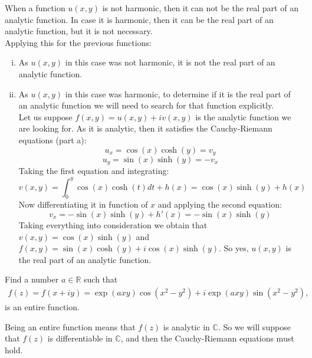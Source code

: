 \documentclass{report}
\def\R{\mathbb{R}}
\def\C{\mathbb{C}}
\renewcommand{\exp}[1]{\operatorname{exp} \left(#1\right)}
\begin{document}
    When a function $u(x,y)$ is not harmonic, then it can not be the real part of an analytic function. In case it is harmonic, then it can be the real part of an analytic function, but it is not necessary.\\
    Applying this for the previous functions:
    \begin{enumerate}[(i)]
        \item As $u(x,y)$ in this case was not harmonic, it is not the real part of an analytic function.
        \item As $u(x,y)$ in this case was harmonic, to determine if it is the real part of an analytic function we will need to search for that function explicitly. 
        \\Let us suppose $f(x,y)=u(x,y)+iv(x,y)$ is the analytic function we are looking for. As it is analytic, then it satisfies the Cauchy-Riemann equations (part a):\\
        \begin{equation*}
            u_x=\cos(x)\cosh(y)=v_y
        \end{equation*}
        \begin{equation*}
            u_y=\sin(x)\sinh(y)=-v_x
        \end{equation*}
        Taking the first equation and integrating:\\
        \begin{equation*}
            v(x,y)=\int_{0}^y\cos(x)\cosh(t)dt+h(x)=\cos(x)\sinh(y)+h(x)
        \end{equation*}
        Now differentiating it in function of $x$ and applying the second equation:\\
        \begin{equation*}
            v_x=-\sin(x)\sinh(y) + h'(x) = -\sin(x)\sinh(y)
        \end{equation*}
        Taking everything into consideration we obtain that $v(x,y)=\cos(x)\sinh(y)$ and $f(x,y)= \sin(x)\cosh(y)+i\cos(x)\sinh(y)$. So yes, $u(x,y)$ is the real part of an analytic function.
    \end{enumerate}
    \begin{tcolorbox}[title=Part c]
        Find a number $a\in\R$ such that
        \begin{align*}
            f(z)=f(x+iy)=\exp{axy}\cos(x^2-y^2)+i\exp{axy}\sin(x^2-y^2),
        \end{align*}
        is an entire function.
    \end{tcolorbox}
    Being an entire function means that $f(z)$ is analytic in $\C$. So we will suppose that $f(z)$ is differentiable in $\C$, and then the Cauchy-Riemann equations must hold.\\
\end{document}
